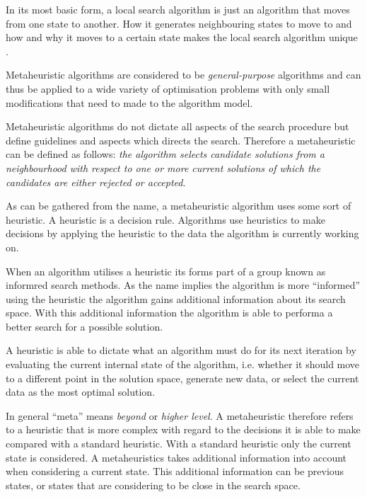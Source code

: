 In its most basic form, a local search algorithm is just an algorithm that moves from one state to another. How it generates neighbouring states to move to and how and why it moves to a certain state makes the local search algorithm unique \cite{AIModernApproach,CompuIntelligenceIntro,NonlinearGlobalTabu}.

Metaheuristic algorithms are considered to be \emph{general-purpose} algorithms and can thus be applied to a wide variety of optimisation problems with only small modifications that need to made to the algorithm model\cite{MetaGraph}.

Metaheuristic algorithms do not dictate all aspects of the search procedure but define guidelines and aspects which directs the search\cite{HandbookofMH}. Therefore a metaheuristic can be defined as follows: \emph{the algorithm selects candidate solutions from a neighbourhood with respect to one or more current solutions of which the candidates are either rejected or accepted}\cite{HandbookofMH}.

As can be gathered from the name, a metaheuristic algorithm uses some sort of heuristic. A heuristic is a decision rule. Algorithms use heuristics to make decisions by applying the heuristic to the data the algorithm is currently working on\cite{AIModernApproach,NatureInspiredMetaHeuristic}.

When an algorithm utilises a heuristic its forms part of a group known as informred search methods. As the name implies the algorithm is more ``informed'' using the heuristic the algorithm gains additional information about its search space. With this additional information the algorithm is able to performa a better search for a possible solution\cite{AIModernApproach}.

A heuristic is able to dictate what an algorithm must do for its next iteration by evaluating the current internal state of the algorithm, i.e. whether it should move to a different point in the solution space, generate new data, or select the current data as the most optimal solution\cite{AIModernApproach,NatureInspiredMetaHeuristic}.

In general ``meta'' means \emph{beyond} or \emph{higher level}\cite{AIModernApproach,NatureInspiredMetaHeuristic}. A metaheuristic therefore refers to a heuristic that is more complex with regard to the decisions it is able to make compared with a standard heuristic\cite{AIModernApproach,NatureInspiredMetaHeuristic}. With a standard heuristic only the current state is considered\cite{AIModernApproach}. A metaheuristics takes additional information into account when considering a current state\cite{NatureInspiredMetaHeuristic}. This additional information can be previous states, or states that are considering to be close in the search space\cite{AIModernApproach, NatureInspiredMetaHeuristic}.

